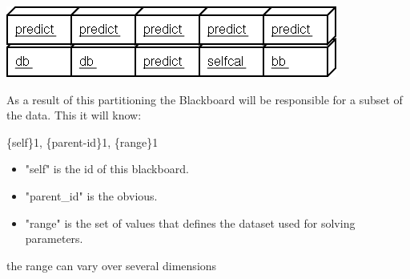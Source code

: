 \documentclass[]{lofar}
\begin{document}
   
{{\includegraphics[]{bb.subcluster.png}}}



    As a result of this partitioning the Blackboard will be responsible
    for a subset of the data. This it will know:

   



    \{self\}1, \{parent-id\}1, \{range\}1

    \begin{itemize}

	\item 


       "self" is the id of this blackboard.

      


	\item 


       "parent\_id" is the obvious.

      


	\item 


       "range" is the set of values that defines the dataset used for
       solving parameters.

      

\end{itemize}




    the range can vary over several dimensions

   
\end{document}
